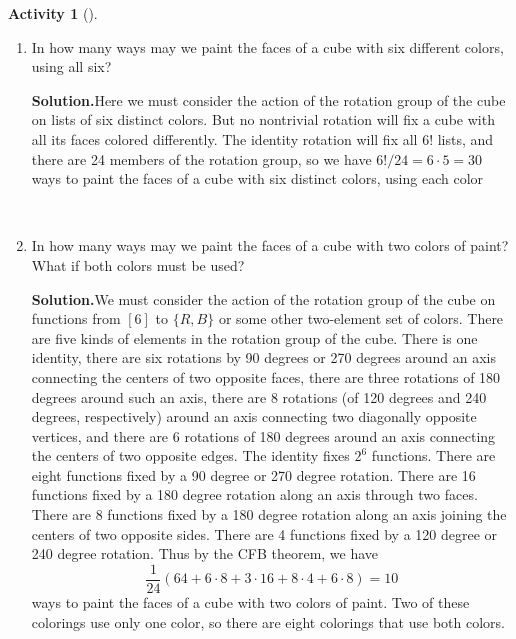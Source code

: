 \documentclass[10pt,]{book}
\theoremstyle{plain}
\theoremstyle{definition}
\newtheorem{activity}[project]{Activity}
\numberwithin{equation}{chapter}
\begin{document}
\begin{activity}[]\label{activity-313}
~\par
\begin{enumerate}[label=(\alph*)]
 \item In how many ways may we paint the faces of a cube with six different colors, using all six?%
\par\medskip\noindent%
\textbf{Solution.}\quad Here we must consider the action of the rotation group of the cube on lists of six distinct colors. But no nontrivial rotation will fix a cube with all its faces colored differently. The identity rotation will fix all \(6!\) lists, and there are 24 members of the rotation group, so we have \(6!/24=6\cdot5=30\) ways to paint the faces of a cube with six distinct colors, using each color%

~\par
\item In how many ways may we paint the faces of a cube with two colors of paint? What if both colors must be used?%
\par\medskip\noindent%
\textbf{Solution.}\quad We must consider the action of the rotation group of the cube on functions from \([6]\) to \(\{R,B\}\) or some other two-element set of colors. There are five kinds of elements in the rotation group of the cube. There is one identity, there are six rotations by 90 degrees or 270 degrees around an axis connecting the centers of two opposite faces, there are three rotations of 180 degrees around such an axis, there are 8 rotations (of 120 degrees and 240 degrees, respectively) around an axis connecting two diagonally opposite vertices, and there are 6 rotations of 180 degrees around an axis connecting the centers of two opposite edges. The identity fixes \(2^6\) functions. There are eight functions fixed by a 90 degree or 270 degree rotation. There are 16 functions fixed by a 180 degree rotation along an axis through two faces. There are 8 functions fixed by a 180 degree rotation along an axis joining the centers of two opposite sides. There are 4 functions fixed by a 120 degree or 240 degree rotation. Thus by the CFB theorem, we have%
\begin{equation*}
\frac{1}{24}(64+6\cdot8 + 3\cdot16+ 8\cdot 4 +6\cdot8)= 10
\end{equation*}
ways to paint the faces of a cube with two colors of paint. Two of these colorings use only one color, so there are eight colorings that use both colors.%

\end{enumerate}
\end{activity}
\end{document}
